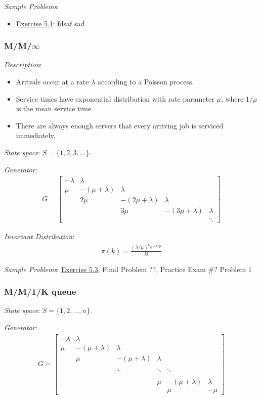 \documentclass[12pt]{article}
\begin{document}
\textit{Sample Problems}: 
\begin{itemize}[nolistsep]
    \item \hyperref[Exercise 5.1]{Exercise 5.1}: fdsaf sad
\end{itemize}


\subsubsection{M/M/\(\infty\)}
\textit{Description}:
\begin{itemize}[nolistsep]
\item Arrivals occur at a rate \( \lambda \) according to a Poisson process. 
\item Service times have exponential distribution with rate parameter \( \mu \), where \( 1/\mu \) is the mean service time.
\item There are always enough servers that every arriving job is serviced immediately.
\end{itemize}


\textit{State space}: \( S = \{1,2,3,\ldots\} \).

\textit{Generator}:
\begin{align*}
    G = \left[\begin{array}{cccccc}
        -\lambda & \lambda \\
        \mu & -(\mu+\lambda) & \lambda \\
        & 2\mu & -(2\mu+\lambda) & \lambda \\
        & & 3\mu & -(3\mu+\lambda) & \lambda \\
        && & & \ddots 
    \end{array}\right]
\end{align*}

\textit{Invariant Distribution}:
\begin{align*}
    \pi(k) = \frac{(\lambda/\mu)^ke^{-\lambda/\mu}}{k!}
\end{align*}


\textit{Sample Problems}: \hyperref[Exercise 5.3]{Exercise 5.3}, Final Problem ??, Practice Exam \#? Problem 1


\subsubsection{M/M/1/K queue}

\textit{State space}: \( S = \{1,2,\ldots, n\} \).

\textit{Generator}:
\begin{align*}
    G = \left[\begin{array}{cccccc}
        -\lambda & \lambda \\
        \mu & -(\mu+\lambda) & \lambda \\
        & \mu & -(\mu+\lambda) & \lambda \\
        \\
        && \ddots & \ddots & \ddots \\
        \\
        &&& \mu & -(\mu+\lambda) & \lambda \\
        &&&& \mu & -\mu
    \end{array}\right]
\end{align*}
\end{document}

